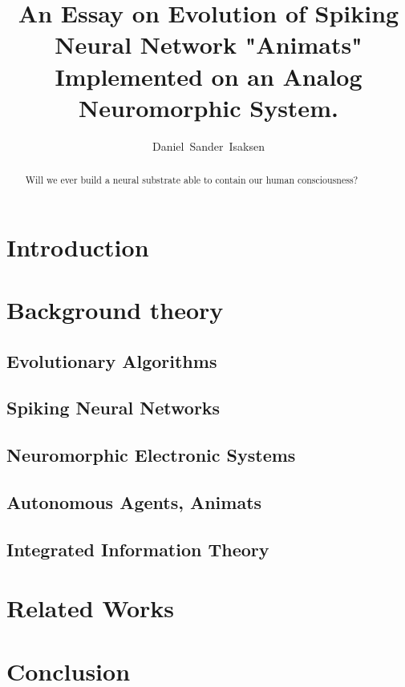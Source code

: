 \documentclass[UKenglish]{ifimaster}
\title{An Essay on Evolution of Spiking Neural Network "Animats" Implemented on an Analog Neuromorphic System.}
\author{Daniel~Sander~Isaksen}%
\begin{document}
\maketitle

\begin{abstract}
Will we ever build a neural substrate able to contain our human consciousness?
\end{abstract}

\setcounter{tocdepth}{3}
\tableofcontents{}

\chapter{Introduction}\label{sect:intro}


\chapter{Background theory}

\section{Evolutionary Algorithms}\label{sect:ea}


\section{Spiking Neural Networks}\label{sect:snn}


\section{Neuromorphic Electronic Systems}\label{sect:neuromorphic}


\section{Autonomous Agents, Animats}\label{sect:agent}


\section{Integrated Information Theory}\label{sect:iit}


\chapter{Related Works}


\chapter{Conclusion}


\printbibliography
\end{document}
